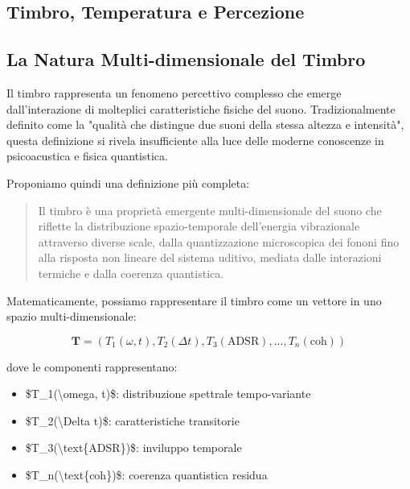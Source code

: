 \documentclass[a4paper,11pt]{article}
\begin{document}
\subsection{Timbro, Temperatura e Percezione}\hypertarget{timbro-temperatura-e-percezione}{}\label{timbro-temperatura-e-percezione}

\subsection{La Natura Multi-dimensionale del Timbro}\hypertarget{la-natura-multi-dimensionale-del-timbro}{}\label{la-natura-multi-dimensionale-del-timbro}

Il timbro rappresenta un fenomeno percettivo complesso che emerge
dall'interazione di molteplici caratteristiche fisiche del suono.
Tradizionalmente definito come la "qualità che distingue due suoni
della stessa altezza e intensità", questa definizione si rivela
insufficiente alla luce delle moderne conoscenze in psicoacustica e
fisica quantistica.

Proponiamo quindi una definizione più completa:

\begin{quote}
Il timbro è una proprietà emergente multi-dimensionale del suono che
riflette la distribuzione spazio-temporale dell'energia vibrazionale
attraverso diverse scale, dalla quantizzazione microscopica dei fononi
fino alla risposta non lineare del sistema uditivo, mediata dalle
interazioni termiche e dalla coerenza quantistica.
\end{quote}

Matematicamente, possiamo rappresentare il timbro come un vettore in uno
spazio multi-dimensionale:

\begin{displaymath}
\mathbf{T} = \left(T_1(\omega, t), T_2(\Delta t), T_3(\text{ADSR}), ..., T_n(\text{coh})\right)
\end{displaymath}

dove le componenti rappresentano:

\begin{itemize}
\item{} \$T\_1(\textbackslash{}omega, t)\$: distribuzione spettrale tempo-variante
\item{} \$T\_2(\textbackslash{}Delta t)\$: caratteristiche transitorie
\item{} \$T\_3(\textbackslash{}text\{ADSR\})\$: inviluppo temporale
\item{} \$T\_n(\textbackslash{}text\{coh\})\$: coerenza quantistica residua
\end{itemize}
\end{document}
